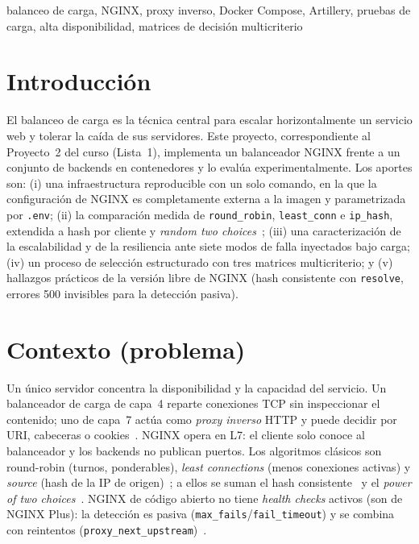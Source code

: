 \documentclass[conference]{IEEEtran}
\begin{document}
\begin{IEEEkeywords}
balanceo de carga, NGINX, proxy inverso, Docker Compose, Artillery, pruebas de carga, alta disponibilidad, matrices de decisión multicriterio
\end{IEEEkeywords}

\section{Introducción}
El balanceo de carga es la técnica central para escalar horizontalmente un servicio web y tolerar la caída de sus servidores. Este proyecto, correspondiente al Proyecto~2 del curso (Lista~1), implementa un balanceador NGINX frente a un conjunto de backends en contenedores y lo evalúa experimentalmente. Los aportes son: (i) una infraestructura reproducible con un solo comando, en la que la configuración de NGINX es completamente externa a la imagen y parametrizada por \texttt{.env}; (ii) la comparación medida de \texttt{round\_robin}, \texttt{least\_conn} e \texttt{ip\_hash}, extendida a hash por cliente y \emph{random two choices}~\cite{mitzenmacher2001}; (iii) una caracterización de la escalabilidad y de la resiliencia ante siete modos de falla inyectados bajo carga; (iv) un proceso de selección estructurado con tres matrices multicriterio; y (v) hallazgos prácticos de la versión libre de NGINX (hash consistente con \texttt{resolve}, errores 500 invisibles para la detección pasiva).

\section{Contexto (problema)}
Un único servidor concentra la disponibilidad y la capacidad del servicio. Un balanceador de carga de capa~4 reparte conexiones TCP sin inspeccionar el contenido; uno de capa~7 actúa como \emph{proxy inverso} HTTP y puede decidir por URI, cabeceras o cookies~\cite{digitalocean_haproxy}. NGINX opera en L7: el cliente solo conoce al balanceador y los backends no publican puertos. Los algoritmos clásicos son round-robin (turnos, ponderables), \emph{least connections} (menos conexiones activas) y \emph{source} (hash de la IP de origen)~\cite{nginx_lb}; a ellos se suman el hash consistente~\cite{karger1997} y el \emph{power of two choices}~\cite{mitzenmacher2001}. NGINX de código abierto no tiene \emph{health checks} activos (son de NGINX Plus): la detección es pasiva (\texttt{max\_fails}/\texttt{fail\_timeout}) y se combina con reintentos (\texttt{proxy\_next\_upstream})~\cite{nginx_upstream}.
\end{document}
